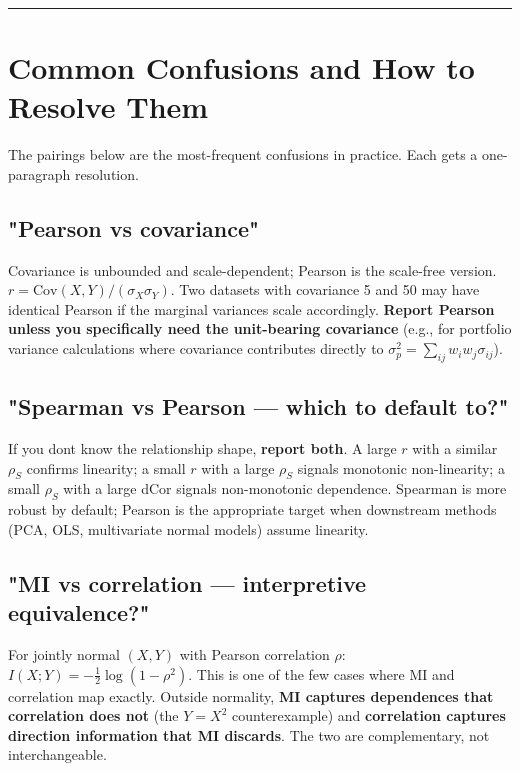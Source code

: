 \documentclass{article}
\let\oldsection\section
\renewcommand{\section}{\clearpage\oldsection}
\begin{document}
\begin{center}\rule{0.5\linewidth}{0.5pt}\end{center}

\section{Common Confusions and How to Resolve
Them}\label{common-confusions-and-how-to-resolve-them}

The pairings below are the most-frequent confusions in practice. Each
gets a one-paragraph resolution.

\subsection{"Pearson vs covariance"}\label{pearson-vs-covariance}

Covariance is unbounded and scale-dependent; Pearson is the scale-free
version. \(r = \mathrm{Cov}(X, Y) / (\sigma_X \sigma_Y)\). Two datasets
with covariance 5 and 50 may have identical Pearson if the marginal
variances scale accordingly. \textbf{Report Pearson unless you
specifically need the unit-bearing covariance} (e.g., for portfolio
variance calculations where covariance contributes directly to
\(\sigma_p^2 = \sum_{ij} w_i w_j \sigma_{ij}\)).

\subsection{"Spearman vs Pearson --- which to default
to?"}\label{spearman-vs-pearson--which-to-default-to}

If you don\textquotesingle t know the relationship shape, \textbf{report
both}. A large \(r\) with a similar \(\rho_S\) confirms linearity; a
small \(r\) with a large \(\rho_S\) signals monotonic non-linearity; a
small \(\rho_S\) with a large dCor signals non-monotonic dependence.
Spearman is more robust by default; Pearson is the appropriate target
when downstream methods (PCA, OLS, multivariate normal models) assume
linearity.

\subsection{"MI vs correlation --- interpretive
equivalence?"}\label{mi-vs-correlation--interpretive-equivalence}

For jointly normal \((X, Y)\) with Pearson correlation \(\rho\):
\(I(X; Y) = -\tfrac{1}{2}\log(1 - \rho^2)\). This is one of the few
cases where MI and correlation map exactly. Outside normality,
\textbf{MI captures dependences that correlation does not} (the
\(Y = X^2\) counterexample) and \textbf{correlation captures direction
information that MI discards}. The two are complementary, not
interchangeable.
\end{document}
